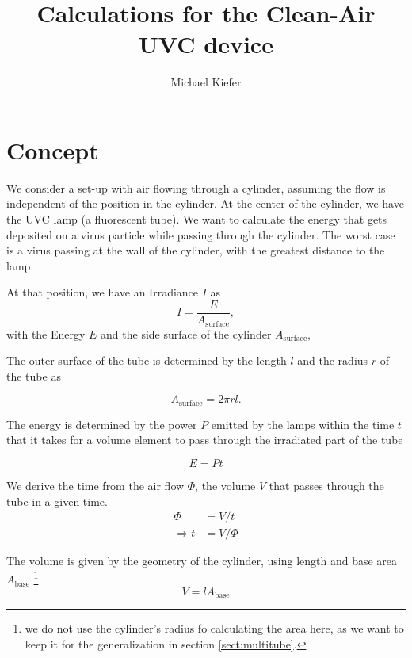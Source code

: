 \documentclass[12pt]{article}
\author{Michael Kiefer}
\title{Calculations for the Clean-Air UVC device}
\begin{document}
\maketitle{}

\section{Concept}
We consider a set-up with air flowing through a cylinder, assuming the flow is independent of the position in the cylinder. At the center of the cylinder, we have the UVC lamp (a fluorescent tube). 
We want to calculate the energy that gets deposited on a virus particle while passing through the cylinder. The worst case is a virus passing at the wall of the cylinder, with the greatest distance to the lamp.

At that position, we have an Irradiance $I$ as
\begin{equation}
I   = \frac{E}{A_{\text{surface}}},  \label{eqn:irradiance}
\end{equation}
with the Energy $E$ and the side surface of the cylinder $A_{\text{surface}}$,

The outer surface of the tube is determined by the length $l$ and the radius $r$ of the tube as

\begin{equation}
A_{\text{surface}} = 2\pi r l.  \label{eqn:surface}
\end{equation}

The energy is determined by the power $P$ emitted by the lamps within the time $t$ that it takes for a volume element to pass through the irradiated part of the tube

\begin{equation}
E = P  t  \label{eqn:energy}
\end{equation}

We derive the time from the air flow $\Phi$, the volume $V$ that passes through the tube in a given time.
\begin{align}
\Phi &= V / t\\
\Rightarrow t &=V / \Phi
\end{align}

The volume is given by the geometry of the cylinder, using length and base area $A_{\text{base}}$
\footnote{we do not use the cylinder's radius fo calculating the area here, as we want to keep it for the generalization in section \ref{sect:multitube}.}
\begin{equation}
V = l A_{\text{base}} \label{eqn:volume}
\end{equation}
\end{document}
